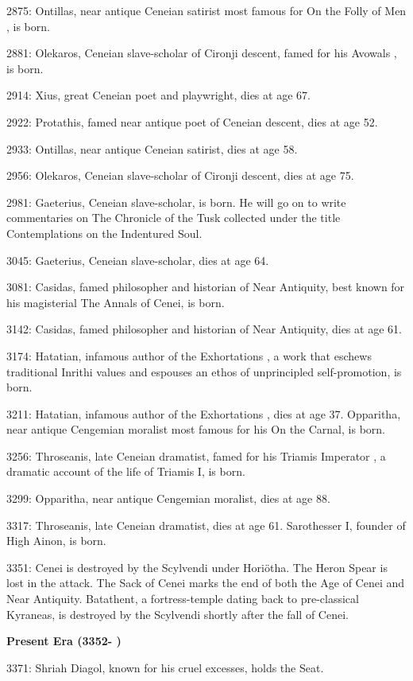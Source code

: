 \documentclass[]{book}
\begin{document}
2875: Ontillas, near antique Ceneian satirist most famous for On the Folly of Men , is
born.

2881: Olekaros, Ceneian slave-scholar of Cironji descent, famed for his Avowals , is
born.

2914: Xius, great Ceneian poet and playwright, dies at age 67.

2922: Protathis, famed near antique poet of Ceneian descent, dies at age 52.

2933: Ontillas, near antique Ceneian satirist, dies at age 58.

2956: Olekaros, Ceneian slave-scholar of Cironji descent, dies at age 75.

2981: Gaeterius, Ceneian slave-scholar, is born. He will go on to write commentaries
on The Chronicle of the Tusk collected under the title Contemplations on the
Indentured Soul.

3045: Gaeterius, Ceneian slave-scholar, dies at age 64.

3081: Casidas, famed philosopher and historian of Near Antiquity, best known for his
magisterial The Annals of Cenei, is born.

3142: Casidas, famed philosopher and historian of Near Antiquity, dies at age 61.

3174: Hatatian, infamous author of the Exhortations , a work that eschews traditional
Inrithi values and espouses an ethos of unprincipled self-promotion, is born.

3211: Hatatian, infamous author of the Exhortations , dies at age 37. Opparitha, near
antique Cengemian moralist most famous for his On the Carnal, is born.

3256: Throseanis, late Ceneian dramatist, famed for his Triamis Imperator , a
dramatic account of the life of Triamis I, is born.

3299: Opparitha, near antique Cengemian moralist, dies at age 88.

3317: Throseanis, late Ceneian dramatist, dies at age 61. Sarothesser I, founder of
High Ainon, is born.

3351: Cenei is destroyed by the Scylvendi under Horiötha. The Heron Spear is lost in
the attack. The Sack of Cenei marks the end of both the Age of Cenei and Near
Antiquity. Batathent, a fortress-temple dating back to pre-classical Kyraneas, is
destroyed by the Scylvendi shortly after the fall of Cenei.

\textbf{Present Era (3352- )}

3371: Shriah Diagol, known for his cruel excesses, holds the Seat.
\end{document}
